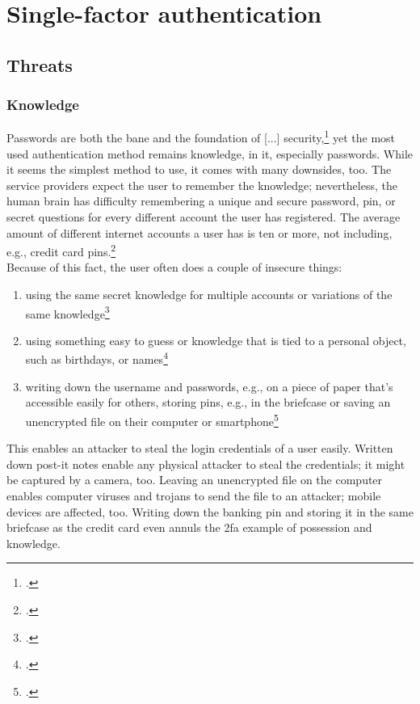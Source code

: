 \chapter{Single-factor authentication}


\section{Threats}
\label{sec:one-factor-threats}

\subsection{Knowledge}

\frqq Passwords are both the bane and the foundation of [...] security\flqq{},\footcite[206]{517355} yet the most used authentication method remains knowledge, in \gls{it}, especially passwords. While it seems the simplest method to use, it comes with many downsides, too. The service providers expect the user to remember the knowledge; nevertheless, the human brain has difficulty remembering a unique and secure password, \gls{pin}, or secret questions for every different account the user has registered. The average amount of different internet accounts a user has is ten or more, not including, e.g., credit card \glspl{pin}.\footcites[See][7, 9]{lastpass}\\
Because of this fact, the user often does a couple of insecure things:

\begin{enumerate}[label=(\alph*)]
	\item using the same secret knowledge for multiple accounts or variations of the same knowledge\footcites[See][8]{yougov}[See][14]{sweden-passwords}[See][7]{lastpass}
	\item using something easy to guess or knowledge that is tied to a personal object, such as birthdays, or names\footcite[See][]{web-de-passwords}
	\item writing down the username and passwords, e.g., on a piece of paper that's accessible easily for others, storing \glspl{pin}, e.g., in the briefcase or saving an unencrypted file on their computer or smartphone\footcite[See][]{web-de-passwords}

\end{enumerate}

This enables an attacker to steal the login credentials of a user easily. Written down post-it notes enable any physical attacker to steal the credentials; it might be captured by a camera, too. Leaving an unencrypted file on the computer enables computer viruses and trojans to send the file to an attacker; mobile devices are affected, too. Writing down the banking \gls{pin} and storing it in the same briefcase as the credit card even annuls the \gls{2fa} example of possession and knowledge.

